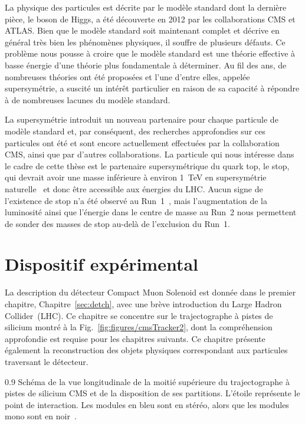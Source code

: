 La physique des particules est décrite par le modèle standard dont la dernière pièce, le boson de Higgs, a été découverte en 2012 par les collaborations CMS et ATLAS. Bien que le mo\-dèle standard soit maintenant complet et décrive en général très bien les phénomènes physiques, il souffre de plusieurs défauts. Ce problème nous pousse à croire que le mo\-dèle standard est une théorie effective à basse énergie d’une théorie plus fondamentale à déterminer. Au fil des ans, de nombreuses théories ont été proposées et l'une d'entre elles, appelée supersymétrie, a suscité un intérêt particulier en raison de sa capacité à répondre à de nombreuses lacunes du mo\-dèle standard.

La supersymétrie introduit un nouveau partenaire pour chaque particule de modèle standard et, par conséquent, des recherches approfondies sur ces particules ont été et sont encore actuellement effectuées par la collaboration CMS, ainsi que par d’autres colla\-borations. La particule qui nous intéresse dans le cadre de cette thèse est le partenaire supersymétrique du quark top, le stop, qui devrait avoir une masse inférieure à environ 1~TeV en supersymétrie naturelle~\cite{Martin:1997ns, Barbieri:1987fn, Papucci:2011wy} et donc être accessible aux énergies du LHC. Aucun signe de l'existence de stop n'a été observé au Run~1~\cite{website:SUSYresRunI}, mais l'augmentation de la luminosité ainsi que l'énergie dans le centre de masse au Run~2 nous permettent de sonder des masses de stop au-delà de l'exclusion du Run~1.

\section{Dispositif expérimental}


La description du  détecteur Compact Muon Solenoid est donnée dans le premier chapitre, Chapitre~\ref{sec:detch}, avec une brève introduction du Large Hadron Collider~(LHC). Ce chapitre se concentre sur le trajectographe à pistes de silicium montré  à la Fig.~\ref{fig:figures/cmsTracker2}, dont la compréhension approfondie est requise pour les chapitres suivants. Ce chapitre présente également la reconstruction des objets physiques correspondant aux particules traversant le détecteur. 

                 {0.9}
                 { Schéma de la vue longitudinale de la moitié supérieure du trajectographe à pistes de silicium CMS et de la disposition de ses partitions. L'étoile représente le point de interaction. Les modules en bleu sont en stéréo, alors que les modules mono sont en noir~\cite{Chatrchyan:2014fea}.}

